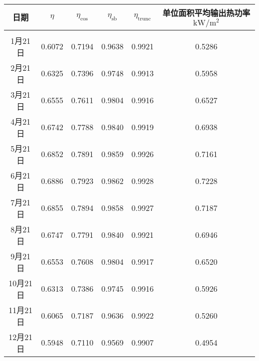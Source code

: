 \begin{tabular}{|c|ccccc|}
\hline
日期 & \(\eta\) & \(\eta _{\cos}\) & \(\eta _{\mathrm{s b}}\) & \(\eta _{\mathrm{trunc}}\) & 单位面积平均输出热功率\(\mathrm{kW}/\mathrm{m}^{2}\)\\
\hline
\\[-1em]
1月21日  & 0.6072 & 0.7194 & 0.9638 & 0.9921 & 0.5286\\
2月21日  & 0.6325 & 0.7396 & 0.9748 & 0.9913 & 0.5958\\  
3月21日  & 0.6555 & 0.7611 & 0.9804 & 0.9916 & 0.6527\\
4月21日  & 0.6742 & 0.7788 & 0.9840 & 0.9919 & 0.6938\\
5月21日  & 0.6852 & 0.7891 & 0.9859 & 0.9926 & 0.7161\\
6月21日  & 0.6886 & 0.7923 & 0.9862 & 0.9928 & 0.7228\\
7月21日  & 0.6855 & 0.7894 & 0.9858 & 0.9927 & 0.7187\\
8月21日  & 0.6747 & 0.7791 & 0.9840 & 0.9921 & 0.6946\\
9月21日  & 0.6553 & 0.7608 & 0.9804 & 0.9917 & 0.6520\\
10月21日 & 0.6313 & 0.7386 & 0.9745 & 0.9916 & 0.5926\\
11月21日 & 0.6065 & 0.7187 & 0.9636 & 0.9922 & 0.5260\\
12月21日 & 0.5948 & 0.7110 & 0.9569 & 0.9907 & 0.4954\\
\hline
\end{tabular}
